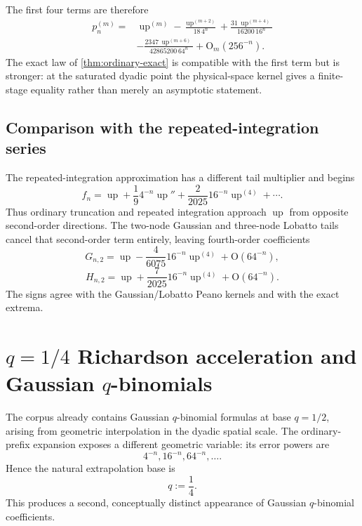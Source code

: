 \documentclass[11pt]{article}
\numberwithin{equation}{section}
\theoremstyle{definition}
\theoremstyle{remark}
\newcommand{\Up}{\operatorname{up}}
\newcommand{\Oh}{\mathrm O}
\begin{document}
The first four terms are therefore
\begin{equation}
 \boxed{
 \begin{aligned}
 p_n^{(m)}={}&\Up^{(m)}
 -\frac{\Up^{(m+2)}}{18\,4^n}
 +\frac{31\,\Up^{(m+4)}}{16200\,16^n}\\
 &-\frac{2347\,\Up^{(m+6)}}{42865200\,64^n}
 +\Oh_m(256^{-n}).
 \end{aligned}}
 \label{eq:prefix-first-terms}
\end{equation}
The exact law of \cref{thm:ordinary-exact} is compatible with the first term but is stronger: at the saturated dyadic point the physical-space kernel gives a finite-stage equality rather than merely an asymptotic statement.

\subsection{Comparison with the repeated-integration series}

The repeated-integration approximation has a different tail multiplier and begins
\[
 f_n=\Up+\frac1{9}4^{-n}\Up''+\frac{2}{2025}16^{-n}\Up^{(4)}+\cdots.
\]
Thus ordinary truncation and repeated integration approach $\Up$ from opposite second-order directions.  The two-node Gaussian and three-node Lobatto tails cancel that second-order term entirely, leaving fourth-order coefficients
\begin{equation}
 G_{n,2}=\Up-\frac4{6075}16^{-n}\Up^{(4)}+\Oh(64^{-n}),
 \label{eq:G2-leading}
\end{equation}
\begin{equation}
 H_{n,2}=\Up+\frac7{2025}16^{-n}\Up^{(4)}+\Oh(64^{-n}).
 \label{eq:H2-leading}
\end{equation}
The signs agree with the Gaussian/Lobatto Peano kernels and with the exact extrema.

\section{$q=1/4$ Richardson acceleration and Gaussian $q$-binomials}
\label{sec:q-richardson}

The corpus already contains Gaussian $q$-binomial formulas at base $q=1/2$, arising from geometric interpolation in the dyadic spatial scale.  The ordinary-prefix expansion exposes a different geometric variable: its error powers are
\[
 4^{-n},16^{-n},64^{-n},\ldots.
\]
Hence the natural extrapolation base is
\begin{equation}
 q:=\frac14.
 \label{eq:q-quarter}
\end{equation}
This produces a second, conceptually distinct appearance of Gaussian $q$-binomial coefficients.
\end{document}
